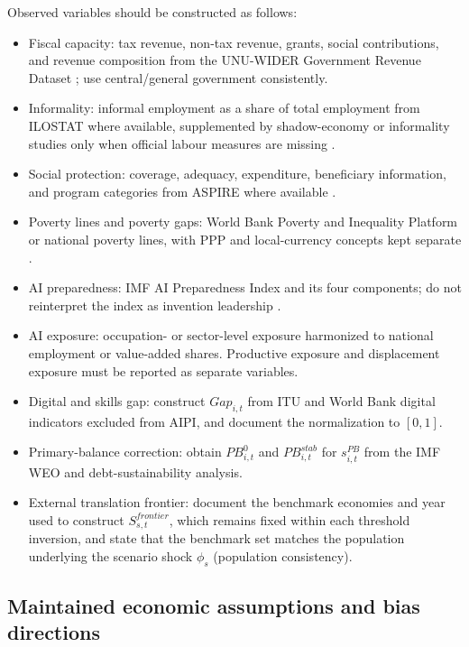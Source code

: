 \documentclass[11pt,a4paper]{article}
\begin{document}
Observed variables should be constructed as follows:
\begin{itemize}
    \item Fiscal capacity: tax revenue, non-tax revenue, grants, social contributions, and revenue composition from the UNU-WIDER Government Revenue Dataset \citep{unu2025grd}; use central/general government consistently.
    \item Informality: informal employment as a share of total employment from ILOSTAT where available, supplemented by shadow-economy or informality studies only when official labour measures are missing \citep{ilostat2026informal,medina2018shadow,worldbank2021informality}.
    \item Social protection: coverage, adequacy, expenditure, beneficiary information, and program categories from ASPIRE where available \citep{worldbank2026aspire}.
    \item Poverty lines and poverty gaps: World Bank Poverty and Inequality Platform or national poverty lines, with PPP and local-currency concepts kept separate \citep{worldbank2026pip}.
    \item AI preparedness: IMF AI Preparedness Index and its four components; do not reinterpret the index as invention leadership \citep{cazzaniga2024genai}.
    \item AI exposure: occupation- or sector-level exposure harmonized to national employment or value-added shares. Productive exposure and displacement exposure must be reported as separate variables.
    \item Digital and skills gap: construct $Gap_{i,t}$ from ITU and World Bank digital indicators excluded from AIPI, and document the normalization to $[0,1]$.
    \item Primary-balance correction: obtain $PB^0_{i,t}$ and $PB^{stab}_{i,t}$ for $s^{PB}_{i,t}$ from the IMF WEO and debt-sustainability analysis.
    \item External translation frontier: document the benchmark economies and year used to construct $S^{frontier}_{s,t}$, which remains fixed within each threshold inversion, and state that the benchmark set matches the population underlying the scenario shock $\phi_s$ (population consistency).
\end{itemize}

\subsection{Maintained economic assumptions and bias directions}
\end{document}
